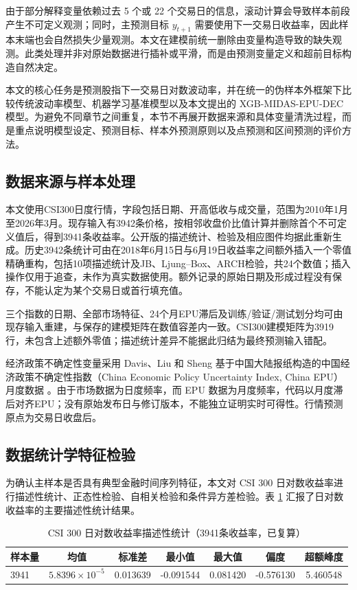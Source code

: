 由于部分解释变量依赖过去 5 个或 22 个交易日的信息，滚动计算会导致样本前段产生不可定义观测；同时，主预测目标 \(y_{t+1}\) 需要使用下一交易日收益率，因此样本末端也会自然损失少量观测。本文在建模前统一删除由变量构造导致的缺失观测。此类处理并非对原始数据进行插补或平滑，而是由预测变量定义和超前目标构造自然决定。

本文的核心任务是预测股指下一交易日对数波动率，并在统一的伪样本外框架下比较传统波动率模型、机器学习基准模型以及本文提出的 XGB-MIDAS-EPU-DEC 模型。为避免不同章节之间重复，本节不再展开数据来源和具体变量清洗过程，而是重点说明模型设定、预测目标、样本外预测原则以及点预测和区间预测的评价方法。

\subsection{数据来源与样本处理}

本文使用CSI300日度行情，字段包括日期、开高低收与成交量，范围为2010年1月至2026年3月。现存输入有3942条价格，按相邻收盘价比值计算并删除首个不可定义值后，得到3941条收益率。公开版的描述统计、检验及相应图件均据此重新生成。历史3942条统计可由在2018年6月15日与6月19日收益率之间额外插入一个零值精确重构，包括10项描述统计及JB、Ljung--Box、ARCH检验，共24个数值；插入操作仅用于追查，未作为真实数据使用。额外记录的原始日期及形成过程没有保存，不能认定为某个交易日或首行填充值。

三个指数的日期、全部市场特征、24个月EPU滞后及训练/验证/测试划分均可由现存输入重建，与保存的建模矩阵在数值容差内一致。CSI300建模矩阵为3919行，未包含上述额外零值；描述统计差异不能据此归结为最终预测输入错配。

经济政策不确定性变量采用 Davis、Liu 和 Sheng 基于中国大陆报纸构造的中国经济政策不确定性指数（China Economic Policy Uncertainty Index, China EPU）月度数据 \citep{DavisLiuSheng2019}。由于市场数据为日度频率，而 EPU 数据为月度频率，代码以月度滞后对齐EPU；没有原始发布日与修订版本，不能独立证明实时可得性。行情预测原点为交易日收盘后。

\subsection{数据统计学特征检验}

为确认主样本是否具有典型金融时间序列特征，本文对 CSI 300 日对数收益率进行描述性统计、正态性检验、自相关检验和条件异方差检验。表 \ref{tab:desc_return_short} 汇报了日对数收益率的主要描述性统计结果。

\begin{table}[!htbp]
	\centering
	\caption{CSI 300 日对数收益率描述性统计（3941条收益率，已复算）}
	\label{tab:desc_return_short}
	\begingroup
	\footnotesize
	\setlength{\tabcolsep}{5pt}
	\renewcommand{\arraystretch}{1.08}
	\begin{tabular}{lcccccc}
		\toprule
		样本量 & 均值 & 标准差 & 最小值 & 最大值 & 偏度 & 超额峰度 \\
		\midrule
		3941 & \(5.8396\times10^{-5}\) & 0.013639 & -0.091544 & 0.081420 & -0.576130 & 5.460548 \\
		\bottomrule
	\end{tabular}
	\endgroup
\end{table}

